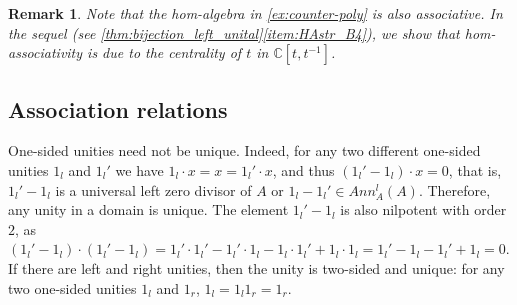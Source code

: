 \documentclass[12pt]{article}
\newtheorem{remark}[theorem]{Remark}
\begin{document}
		\begin{remark}
			Note that the hom-algebra in \cref{ex:counter-poly} is also associative. In the sequel (see \cref{thm:bijection_left_unital}\ref{item:HAstr_B4}), we show that hom-associativity is due to the centrality of $t$ in $\mathbb{C}[t,t^{-1}]$.
		\end{remark}
		
		\subsection{Association relations}\label{ssec:association-relations}
		
		One-sided unities need not be unique. Indeed, for any two different one-sided unities $1_l$ and $1_l'$ we have $1_l\cdot x=x=1_l'\cdot x$, and thus $(1_l'-1_l)\cdot x=0$, that is, $1_l'-1_l$ is a universal left zero divisor of $A$ or $1_l-1_l'\in Ann_A^l(A)$. Therefore, any unity in a domain is unique. The element $1_l'-1_l$ is also nilpotent with order $2$, as $(1_l'-1_l)\cdot (1_l'-1_l)=1_l'\cdot 1_l'-1_l'\cdot 1_l-1_l\cdot 1_l'+1_l\cdot 1_l=1_l'-1_l-1_l'+1_l=0$. If there are left and right unities, then the unity is two-sided and unique: for any two one-sided unities $1_l$ and $1_r$, $1_l=1_l1_r=1_r$.
		
\end{document}
